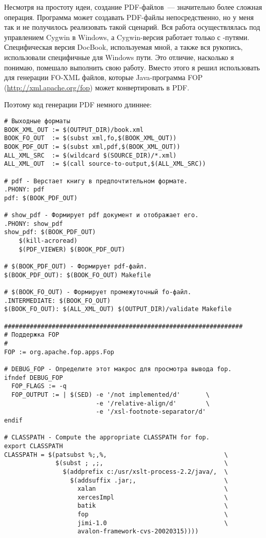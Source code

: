 Несмотря на простоту идеи, создание PDF-файлов~--- значительно более
сложная операция. Программа  может создавать
PDF-файлы непосредственно, но у меня так и не получилось реализовать
такой сценарий. Вся работа осуществлялась под управлением Cygwin в
Windows, а Cygwin-версия  работает только с
\POSIX{}-путями. Специфическая версия DocBook, используемая мной, а
также вся рукопись, использовали специфичные для Windows пути. Это
отличие, насколько я понимаю, помешало  выполнить
свою работу. Вместо этого я решил использовать  для
генерации FO-XML файлов, которые Java-программа FOP
(\url{http://xml.apache.org/fop}) может конвертировать в PDF.

Поэтому код генерации PDF немного длиннее:

\begin{verbatim}
# Выходные форматы
BOOK_XML_OUT := $(OUTPUT_DIR)/book.xml
BOOK_FO_OUT  := $(subst xml,fo,$(BOOK_XML_OUT))
BOOK_PDF_OUT := $(subst xml,pdf,$(BOOK_XML_OUT))
ALL_XML_SRC  := $(wildcard $(SOURCE_DIR)/*.xml)
ALL_XML_OUT  := $(call source-to-output,$(ALL_XML_SRC))

# pdf - Верстает книгу в предпочтительном формате.
.PHONY: pdf
pdf: $(BOOK_PDF_OUT)

# show_pdf - Формирует pdf документ и отображает его.
.PHONY: show_pdf
show_pdf: $(BOOK_PDF_OUT)
    $(kill-acroread)
    $(PDF_VIEWER) $(BOOK_PDF_OUT)

# $(BOOK_PDF_OUT) - Формирует pdf-файл.
$(BOOK_PDF_OUT): $(BOOK_FO_OUT) Makefile

# $(BOOK_FO_OUT) - Формирует промежуточный fo-файл.
.INTERMEDIATE: $(BOOK_FO_OUT)
$(BOOK_FO_OUT): $(ALL_XML_OUT) $(OUTPUT_DIR)/validate Makefile

#################################################################
# Поддержка FOP
#
FOP := org.apache.fop.apps.Fop

# DEBUG_FOP - Определите этот макрос для просмотра вывода fop.
ifndef DEBUG_FOP
  FOP_FLAGS := -q
  FOP_OUTPUT := | $(SED) -e '/not implemented/d'       \
                         -e '/relative-align/d'        \
                         -e '/xsl-footnote-separator/d'
endif

# CLASSPATH - Compute the appropriate CLASSPATH for fop.
export CLASSPATH
CLASSPATH = $(patsubst %;,%,                                \
              $(subst ; ,;,                                 \
                $(addprefix c:/usr/xslt-process-2.2/java/,  \
                  $(addsuffix .jar;,                        \
                    xalan                                   \
                    xercesImpl                              \
                    batik                                   \
                    fop                                     \
                    jimi-1.0                                \
                    avalon-framework-cvs-20020315))))


\end{verbatim}
